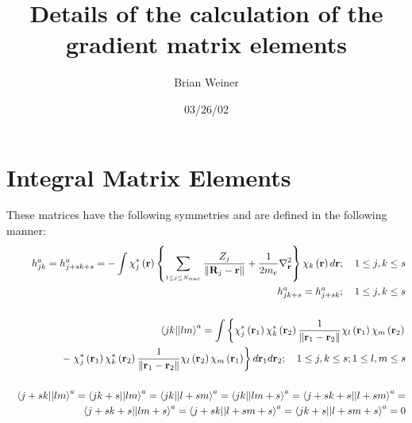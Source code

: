 \documentclass[aps,preprint]{revtex4}
\begin{document}
\title[gradient matrix elements]{Details of the calculation of the gradient
matrix elements}
\author{Brian Weiner}
\affiliation{}
\date{03/26/02}
\endpage{}
\maketitle
\tableofcontents

\section{Integral Matrix Elements}

These matrices have the following symmetries and are defined in the
following manner: 
\begin{eqnarray}
&&h_{jk}^{a}=h_{j+sk+s}^{a}=-\int \chi _{j}^{\ast }\left( \mathbf{r}\right)
\left\{ \sum_{_{1\leq j\leq N_{nuc}}}\frac{Z_{j}}{\left\| \mathbf{R}_{j}-%
\mathbf{r}\right\| }+\frac{1}{2m_{e}}\nabla _{\mathbf{r}}^{2}\right\} \chi
_{k}\left( \mathbf{r}\right) d\mathbf{r};\quad 1\leq j,k\leq s  \notag \\
&&h_{jk+s}^{a}=h_{j+sk}^{a};\quad 1\leq j,k\leq s \\
&&  \notag \\
&&\left\langle jk||lm\right\rangle ^{a}=\int \left\{ \chi _{j}^{\ast }\left( 
\mathbf{r}_{1}\right) \chi _{k}^{\ast }\left( \mathbf{r}_{2}\right) \frac{1}{%
\left\| \mathbf{r}_{1}-\mathbf{r}_{2}\right\| }\chi _{l}\left( \mathbf{r}%
_{1}\right) \chi _{m}\left( \mathbf{r}_{2}\right) \right.   \notag \\
&&\qquad -\left. \chi _{j}^{\ast }\left( \mathbf{r}_{1}\right) \chi
_{k}^{\ast }\left( \mathbf{r}_{2}\right) \frac{1}{\left\| \mathbf{r}_{1}-%
\mathbf{r}_{2}\right\| }\chi _{l}\left( \mathbf{r}_{2}\right) \chi
_{m}\left( \mathbf{r}_{1}\right) \right\} d\mathbf{r}_{1}d\mathbf{r}%
_{2};\quad 1\leq j,k\leq s;1\leq l,m\leq s \\
&&  \notag \\
&&\left\langle j+sk||lm\right\rangle ^{a}=\left\langle jk+s||lm\right\rangle
^{a}=\left\langle jk||l+sm\right\rangle ^{a}=\left\langle
jk||lm+s\right\rangle ^{a}=\left\langle j+sk+s||l+sm\right\rangle ^{a}= 
\notag \\
&&\left\langle j+sk+s||lm+s\right\rangle ^{a}=\left\langle
j+sk||l+sm+s\right\rangle ^{a}=\left\langle jk+s||l+sm+s\right\rangle ^{a}=0
\notag \\
&&\left. {}\right. \quad \qquad \qquad \quad \qquad \qquad \quad \qquad

\end{eqnarray}
\end{document}
